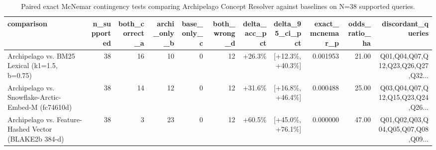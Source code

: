 \begin{table}[t]
\centering
\small
\caption{Paired exact McNemar contingency tests comparing Archipelago Concept Resolver against baselines on N=38 supported queries.}
\label{tab:t3_mcnemar}
\begin{tabular}{lrrrrrrrrrr}
\toprule
\textbf{comparison} & \textbf{n\_supported} & \textbf{both\_correct\_a} & \textbf{archi\_only\_b} & \textbf{base\_only\_c} & \textbf{both\_wrong\_d} & \textbf{delta\_acc\_pct} & \textbf{delta\_95\_ci\_pct} & \textbf{exact\_mcnemar\_p} & \textbf{odds\_ratio\_ha} & \textbf{discordant\_queries} \\
\midrule
Archipelago vs. BM25 Lexical (k1=1.5, b=0.75) & 38 & 16 & 10 & 0 & 12 & +26.3\% & [+12.3\%, +40.3\%] & 0.001953 & 21.00 & Q01,Q04,Q07,Q12,Q23,Q26,Q27,Q32... \\
Archipelago vs. Snowflake-Arctic-Embed-M (fc74610d) & 38 & 14 & 12 & 0 & 12 & +31.6\% & [+16.8\%, +46.4\%] & 0.000488 & 25.00 & Q03,Q04,Q07,Q12,Q15,Q23,Q24,Q26... \\
Archipelago vs. Feature-Hashed Vector (BLAKE2b 384-d) & 38 & 3 & 23 & 0 & 12 & +60.5\% & [+45.0\%, +76.1\%] & 0.000000 & 47.00 & Q01,Q02,Q03,Q04,Q05,Q07,Q08,Q09... \\
\bottomrule
\end{tabular}
\end{table}
